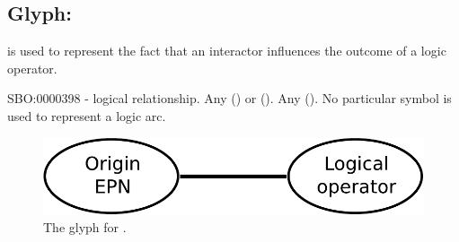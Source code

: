 \subsection{Glyph:  }\label{sec:logicArc}

 is used to represent the fact that an interactor influences
the outcome of a logic operator. 

\begin{glyphDescription}
 \glyphSboTerm SBO:0000398 - logical relationship.
 \glyphOrigin Any  () or  ().
 \glyphTarget Any  ().
 \glyphEndPoint No particular symbol is used to represent a logic arc.
 \end{glyphDescription}


\begin{figure}[H]
  \centering
  \includegraphics[scale = 0.4]{images/logicArc}
  \caption{The \ER glyph for .}
  \label{fig:logicArc}
\end{figure}
